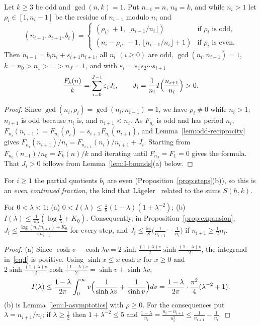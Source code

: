 \begin{proposition}[Expansion]\label{prop:expansion}
Let $k\ge3$ be odd and $\gcd(n,k)=1$. Put $n_{-1}=n$, $n_0=k$, and while $n_i>1$ let $\rho_i\in[1,n_i-1]$ be the residue of $n_{i-1}$ modulo $n_i$ and
\[
(n_{i+1},s_{i+1},b_i)=\begin{cases}(\rho_i,\,+1,\,\lfloor n_{i-1}/n_i\rfloor)&\text{if $\rho_i$ is odd},\\(n_i-\rho_i,\,-1,\,\lfloor n_{i-1}/n_i\rfloor+1)&\text{if $\rho_i$ is even}.\end{cases}
\]
Then $n_{i-1}=b_in_i{+}s_{i+1}n_{i+1}$, all $n_i$ $(i\ge0)$ are odd, $\gcd(n_i,n_{i+1})=1$, $k=n_0>n_1>\dots>n_J=1$, and with $\varepsilon_i=s_1s_2\cdots s_{i+1}$
\[
\frac{F_k(n)}k=\sum_{i=0}^{J-1}\varepsilon_iJ_i,\qquad J_i=\frac1{n_i}I\Bigl(\frac{n_{i+1}}{n_i}\Bigr)>0.
\]
\end{proposition}

\begin{proof}
Since $\gcd(n_i,\rho_i)=\gcd(n_i,n_{i-1})=1$, we have $\rho_i\ne0$ while $n_i>1$; $n_{i+1}$ is odd because $n_i$ is, and $n_{i+1}<n_i$. As $F_{n_i}$ is odd and has period $n_i$, $F_{n_i}(n_{i-1})=F_{n_i}(\rho_i)=s_{i+1}F_{n_i}(n_{i+1})$, and Lemma~\ref{lem:odd-reciprocity} gives $F_{n_i}(n_{i+1})/n_i=F_{n_{i+1}}(n_i)/n_{i+1}+J_i$. Starting from $F_{n_0}(n_{-1})/n_0=F_k(n)/k$ and iterating until $F_{n_J}=F_1=0$ gives the formula. That $J_i>0$ follows from Lemma~\ref{lem:I-bounds}(a) below.
\end{proof}

For $i\ge1$ the partial quotients $b_i$ are even (Proposition~\ref{prop:steps}(b)), so this is an \emph{even continued fraction}, the kind that L\"ageler~\cite{b18} related to the sums $S(h,k)$.

\begin{lemma}\label{lem:I-bounds}
For $0<\lambda<1$: \textup{(a)} $0<I(\lambda)\le\frac\pi8(1-\lambda)(1+\lambda^{-2})$; \textup{(b)} $I(\lambda)\le\frac1{\pi\lambda}(\log\frac1\lambda+K_0)$. Consequently, in Proposition~\ref{prop:expansion}, $J_i\le\frac{\log(n_i/n_{i+1})+K_0}{\pi n_{i+1}}$ for every step, and $J_i\le\frac{5\pi}8\bigl(\frac1{n_{i+1}}-\frac1{n_i}\bigr)$ if $n_{i+1}\ge\frac12n_i$.
\end{lemma}

\begin{proof}
(a) Since $\cosh v-\cosh\lambda v=2\sinh\frac{(1+\lambda)v}2\sinh\frac{(1-\lambda)v}2$, the integrand in~\eqref{eq:I} is positive. Using $\sinh x\le x\cosh x$ for $x\ge0$ and $2\sinh\frac{(1+\lambda)v}2\cosh\frac{(1-\lambda)v}2=\sinh v+\sinh\lambda v$,
\[
I(\lambda)\le\frac{1-\lambda}{2\pi}\int_0^\infty v\Bigl(\frac1{\sinh\lambda v}+\frac1{\sinh v}\Bigr)dv=\frac{1-\lambda}{2\pi}\cdot\frac{\pi^2}4(\lambda^{-2}+1).
\]
(b) is Lemma~\ref{lem:I-asymptotics} with $\rho\ge0$. For the consequences put $\lambda=n_{i+1}/n_i$; if $\lambda\ge\frac12$ then $1+\lambda^{-2}\le5$ and $\frac{1-\lambda}{n_i}=\frac{n_i-n_{i+1}}{n_i^2}\le\frac1{n_{i+1}}-\frac1{n_i}$.
\end{proof}

